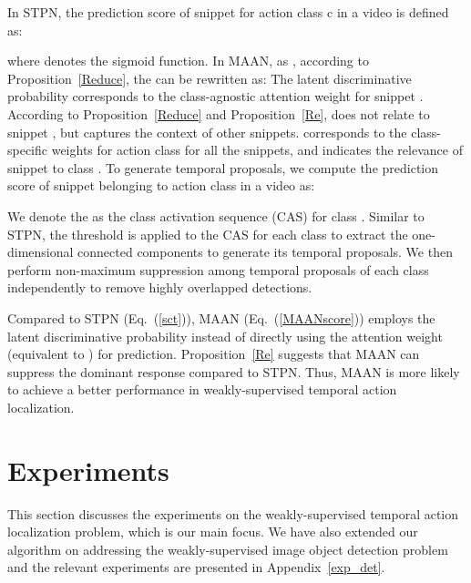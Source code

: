\documentclass{article} \usepackage{iclr2019_conference,times}
\begin{document}
In STPN, the prediction score of snippet  for action class c in a video is defined as:  

where  denotes the sigmoid function. In MAAN, as , according to Proposition~\ref{Reduce}, the  can be rewritten as: 
The latent discriminative probability  corresponds to the class-agnostic attention weight for snippet . According to Proposition~\ref{Reduce} and Proposition~\ref{Re},  does not relate to snippet , but captures the context of other snippets.  corresponds to the class-specific weights for action class  for all the snippets, and  indicates the relevance of snippet  to class . To generate temporal proposals, we compute the prediction score of snippet  belonging to action class  in a video as:

We denote the  as the class activation sequence (CAS) for class . Similar to STPN, the threshold is applied to the CAS for each class to extract the one-dimensional connected components to generate its temporal proposals. We then perform non-maximum suppression among temporal proposals of each class independently to remove highly overlapped detections.

Compared to STPN (Eq.~(\ref{sct})), MAAN (Eq.~(\ref{MAANscore})) employs the latent discriminative probability  instead of directly using the attention weight  (equivalent to ) for prediction. Proposition~\ref{Re} suggests that MAAN can suppress the dominant response  compared to STPN. Thus, MAAN is more likely to achieve a better performance in weakly-supervised temporal action localization.  









  




















 















\section{Experiments}
This section discusses the experiments on the weakly-supervised temporal action localization problem, which is our main focus. We have also extended our algorithm on addressing the weakly-supervised image object detection problem and the relevant experiments are presented in Appendix~\ref{exp_det}.
\end{document}
